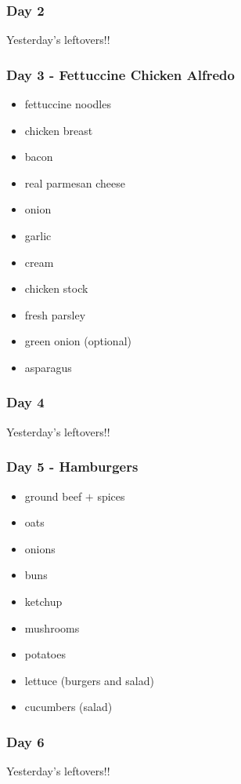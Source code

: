 \documentclass[11pt, a4paper]{article}
\begin{document}
\subsubsection{Day 2}
\vspace{1pc}
Yesterday's leftovers!!

\subsubsection{Day 3 - Fettuccine Chicken Alfredo}
\vspace{1pc}
\begin{itemize}
\item fettuccine noodles
\item chicken breast 
\item bacon 
\item real parmesan cheese
\item onion
\item garlic
\item cream
\item chicken stock 
\item fresh parsley 
\item green onion (optional) 
\item asparagus
\end{itemize}

\subsubsection{Day 4}
\vspace{1pc}
Yesterday's leftovers!!

\subsubsection{Day 5 - Hamburgers}
\vspace{1pc}
\begin{itemize}
\item ground beef $+$ spices
\item oats
\item onions
\item buns
\item ketchup
\item mushrooms
\item potatoes
\item lettuce (burgers and salad)
\item cucumbers (salad)
\end{itemize}

\subsubsection{Day 6}
\vspace{1pc}
Yesterday's leftovers!!
\end{document}
